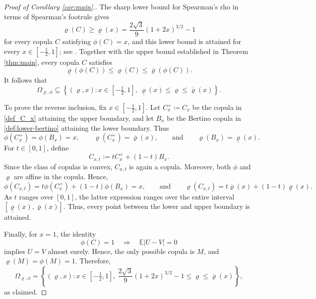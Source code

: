 \documentclass{article}
\newcommand{\E}{\mathbb{E}}
\begin{document}
\begin{proof}[Proof of Corollary \ref{cor:main}.]
The sharp lower bound for Spearman's rho in terms of Spearman's footrule gives
\[
    \varrho(C)
    \geq
    \underline{\varrho}(x)
    =
    \frac{2\sqrt{3}}{9}(1+2x)^{3/2}-1
\]
for every copula \(C\) satisfying \(\phi(C)=x\), and this lower bound is attained for every \(x\in[-\frac12,1]\); see \cite[Theorem 8]{kokolbukovsek2024exact}.
Together with the upper bound established in Theorem \ref{thm:main}, every copula \(C\) satisfies
\[
    \underline{\varrho}(\phi(C))
    \leq
    \varrho(C)
    \leq
    \overline{\varrho}(\phi(C)).
\]
It follows that
\[
    \Omega_{\varrho,\phi}
    \subseteq
    \left\{
        (\varrho,x):
        x\in[-\tfrac12,1],\
        \underline{\varrho}(x)
        \leq \varrho\leq
        \overline{\varrho}(x)
    \right\}.
\]

To prove the reverse inclusion, fix \(x\in[-\frac12,1]\).
Let \(C_x^+\coloneqq C_x\) be the copula in \eqref{def_C_x} attaining the upper boundary, and let \(B_x\) be the Bertino copula in \eqref{def:lower-bertino} attaining the lower boundary.
Thus
\[
    \phi(C_x^+)=\phi(B_x)=x, \qquad 
    \varrho(C_x^+)=\overline{\varrho}(x),
    \qquad \text{and} \qquad
    \varrho(B_x)=\underline{\varrho}(x).
\]
For \(t\in[0,1]\), define
\[
    C_{x,t}
    :=
    tC_x^++(1-t)B_x.
\]
Since the class of copulas is convex, \(C_{x,t}\) is again a copula.
Moreover, both \(\phi\) and \(\varrho\) are affine in the copula.
Hence,
\[
    \phi(C_{x,t})
    =
    t\phi(C_x^+)+(1-t)\phi(B_x)
    =
    x,
\qquad \text{and} \qquad
    \varrho(C_{x,t})
    =
    t\overline{\varrho}(x)
    +(1-t)\underline{\varrho}(x).
\]
As \(t\) ranges over \([0,1]\), the latter expression ranges over the entire interval \([\underline{\varrho}(x),\overline{\varrho}(x)]\).
Thus, every point between the lower and upper boundary is attained.

Finally, for \(x=1\), the identity
\[
    \phi(C)=1
    \quad\Longrightarrow\quad
    \E|U-V|=0
\]
implies \(U=V\) almost surely.
Hence, the only possible copula is \(M\), and \(\varrho(M)=\phi(M)=1\).
Therefore,
\[
    \Omega_{\varrho,\phi}
    =
    \left\{
        (\varrho,x):
        x\in[-\tfrac12,1],\
        \frac{2\sqrt{3}}{9}(1+2x)^{3/2}-1
        \leq \varrho\leq
        \overline{\varrho}(x)
    \right\},
\]
as claimed.
\end{proof}
\end{document}
